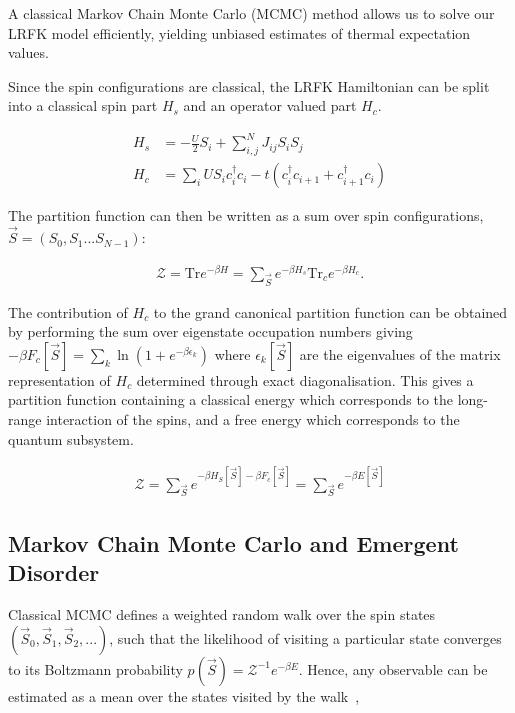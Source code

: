 A classical Markov Chain Monte Carlo (MCMC) method allows us to solve our LRFK model efficiently, yielding unbiased estimates of thermal expectation values.

Since the spin configurations are classical, the LRFK Hamiltonian can be split into a classical spin part \(H_s\) and an operator valued part \(H_c\).

\[\begin{aligned}
H_s& = - \frac{U}{2}S_i + \sum_{i, j}^{N} J_{ij} S_i S_j \\
H_c& = \sum_i U S_i c^\dagger_{i}c_{i} -t(c^\dagger_{i}c_{i+1} + c^\dagger_{i+1}c_{i}) \end{aligned}\]

The partition function can then be written as a sum over spin configurations, \(\vec{S} = (S_0, S_1...S_{N-1})\):

\[\begin{aligned}
\mathcal{Z} = \mathrm{Tr} e^{-\beta H}= \sum_{\vec{S}} e^{-\beta H_s} \mathrm{Tr}_c e^{-\beta H_c} .\end{aligned}\]

The contribution of \(H_c\) to the grand canonical partition function can be obtained by performing the sum over eigenstate occupation numbers giving \(-\beta F_c[\vec{S}] = \sum_k \ln{(1 + e^{- \beta \epsilon_k})}\) where \({\epsilon_k[\vec{S}]}\) are the eigenvalues of the matrix representation of \(H_c\) determined through exact diagonalisation. This gives a partition function containing a classical energy which corresponds to the long-range interaction of the spins, and a free energy which corresponds to the quantum subsystem.

\[\begin{aligned}
\mathcal{Z} = \sum_{\vec{S}} e^{-\beta H_S[\vec{S}] - \beta F_c[\vec{S}]} = \sum_{\vec{S}} e^{-\beta E[\vec{S}]}\end{aligned}\]

\hypertarget{markov-chain-monte-carlo-and-emergent-disorder}{%
\subsection{Markov Chain Monte Carlo and Emergent Disorder}\label{markov-chain-monte-carlo-and-emergent-disorder}}

Classical MCMC defines a weighted random walk over the spin states \((\vec{S}_0, \vec{S}_1, \vec{S}_2, ...)\), such that the likelihood of visiting a particular state converges to its Boltzmann probability \(p(\vec{S}) = \mathcal{Z}^{-1} e^{-\beta E}\). Hence, any observable can be estimated as a mean over the states visited by the walk~\autocite{binderGuidePracticalWork1988,kerteszAdvancesComputerSimulation1998,wolffMonteCarloErrors2004},


